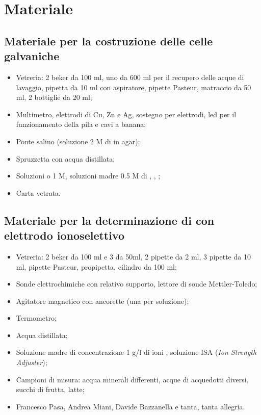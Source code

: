 \section*{Materiale}

\subsection*{Materiale per la costruzione delle celle galvaniche}

\begin{itemize}
        \setlength{\parskip}{0pt}
        \item{Vetreria: 2 beker da 100 ml, uno da 600 ml per il recupero delle acque di lavaggio, 
            pipetta da 10 ml con aspiratore, pipette Pasteur,
            matraccio da 50 ml, 2 bottiglie da 20 ml;}
        \item{Multimetro, elettrodi di Cu, Zn e Ag,
            sostegno per elettrodi, led per il funzionamento della pila e cavi a banana;}
        \item{Ponte salino (soluzione 2 M di  in agar);}
        \item{Spruzzetta con acqua distillata;}
        \item{Soluzioni  o  1 M, soluzioni madre 0.5 M di , , ;}
        \item{Carta vetrata.}
\end{itemize}

\subsection*{Materiale per la determinazione di  con elettrodo ionoselettivo}

\begin{itemize}
        \setlength{\parskip}{0pt}
        \item{Vetreria: 2 beker da 100 ml e 3 da 50ml, 2 pipette da 2 ml, 3 pipette da 10 ml,
        		pipette Pasteur, propipetta, cilindro da 100 ml;}
        \item{Sonde elettrochimiche con relativo supporto, lettore di sonde Mettler-Toledo;}
        \item{Agitatore magnetico con ancorette (una per soluzione);}
        \item{Termometro;}
        \item{Acqua distillata;}
        \item{Soluzione madre di concentrazione 1 g/l di ioni ,
				soluzione ISA (\emph{Ion Strength Adjuster});}
        \item{Campioni di misura: acqua minerali differenti, acque di acquedotti diversi, succhi di
        		frutta, latte;}
        \item{Francesco Pasa, Andrea Miani, Davide Bazzanella e tanta, tanta allegria.}
\end{itemize}